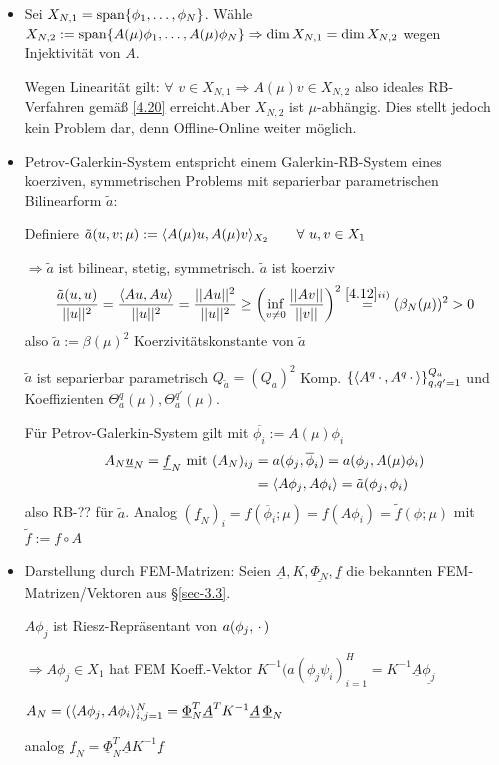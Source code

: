 \begin{bem} \beginwithlistbem
	\begin{itemize}
		\item Sei $X_{N,1} = \op{span}\{\phi_1,\dots,\phi_N\}$. Wähle $X_{N,2} := \op{span} \{A(\mu) \phi_1,\dots,A(\mu)\phi_N\} \Rightarrow \dim X_{N,1} = \dim X_{N,2}$ wegen Injektivität von $A$.
		
		Wegen Linearität gilt: $\forall \,\, v \in X_{N,1} \Rightarrow A(\mu)v \in X_{N,2}$ also ideales RB-Verfahren gemäß \ref{4.20} erreicht.Aber $X_{N,2}$ ist $\mu$-abhängig. Dies stellt jedoch kein Problem dar, denn Offline-Online weiter möglich.
		\item Petrov-Galerkin-System entspricht einem Galerkin-RB-System eines koerziven, symmetrischen Problems mit separierbar parametrischen Bilinearform $\tilde{a}$:
		
		Definiere $\tilde{a}(u,v;\mu) := \langle A(\mu)u, A(\mu)v \rangle_{X_2} \qquad \forall \,\, u,v \in X_1$
		
		$\Rightarrow \tilde{a}$ ist bilinear, stetig, symmetrisch. $\tilde{a}$ ist koerziv
		\[
			\frac{\tilde{a}(u,u)}{||u||^2} = \frac{\langle Au, Au \rangle}{||u||^2} = \frac{||Au||^2}{||u||^2} \geq \left(\inf\limits_{v \neq 0} \frac{||Av||}{||v||} \right)^2 \overset{\ref{4.12} ii)}{=} (\beta_N(\mu))^2 > 0
		\]
		also $\tilde{a} := \beta(\mu)^2$ Koerzivitätskonstante von $\tilde{a}$
		
		$\tilde{a}$ ist separierbar parametrisch $Q_{\tilde{a}} = (Q_a)^2$ Komp.  $\{\langle A^q\,\cdot\,, A^q\,\cdot\, \rangle\}_{q,q' =1}^{Q_a}$ und Koeffizienten $\Theta_a^q(\mu), \Theta_a^{q'}(\mu)$.
		
		Für Petrov-Galerkin-System gilt mit $\overline{\phi_i} := A(\mu) \phi_i$
		\begin{align*}
		A_N \underline{u}_N = \underline{f}_N \text{ mit } (A_N)_{ij} &= a(\phi_j,\overline{\phi}_i) = a(\phi_j, A(\mu)\phi_i) \\
		&= \dotp{A\phi_j}{A\phi_i} = \tilde{a} (\phi_j,\phi_i)
		\end{align*}
		also RB-?? für $\tilde{a}$. Analog $(\underline{f}_N)_i = f(\overline{\phi}_i;\mu) = f(A\phi_i) = \tilde{f}(\phi;\mu)$ mit $\tilde{f} := f \circ A$
		\item Darstellung durch FEM-Matrizen: Seien $\underline{A}, K, \underline{\Phi_N}, \underline{f}$ die bekannten FEM-Matrizen/Vektoren aus §\ref{sec-3.3}.
		
		$A\phi_j$ ist Riesz-Repräsentant von $a(\phi_j,\pdot)$
		
		$\Rightarrow A\phi_j \in X_1$ hat FEM Koeff.-Vektor $K^{-1} (a(\phi_j \psi_i)_{i=1}^H = K^{-1} \underline{A} \underline{\phi_j}$
		
		$A_N= (\dotp{A\phi_j}{A\phi_i}_{i,j=1}^N = \underline{\Phi}_N^T \underline{A}^T K^{-1} \underline{A} \, \underline{\Phi}_N$
		
		analog $\underline{f}_N = \underline{\Phi}_N^T \underline{A} K^{-1} \underline{f}$
		\end{itemize}
\end{bem}